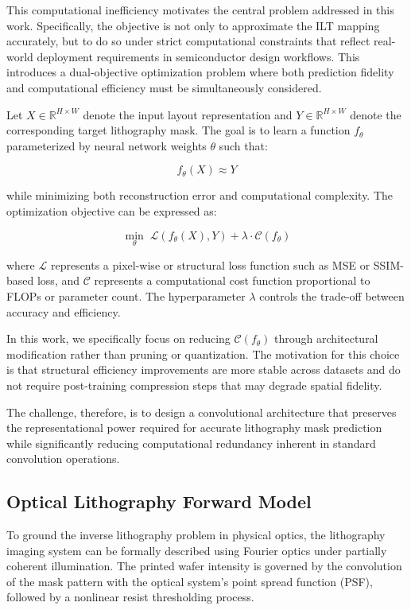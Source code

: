 \documentclass[conference]{IEEEtran}
\begin{document}
This computational inefficiency motivates the central problem addressed in this work. Specifically, the objective is not only to approximate the ILT mapping accurately, but to do so under strict computational constraints that reflect real-world deployment requirements in semiconductor design workflows. This introduces a dual-objective optimization problem where both prediction fidelity and computational efficiency must be simultaneously considered.

Let \( X \in \mathbb{R}^{H \times W} \) denote the input layout representation and \( Y \in \mathbb{R}^{H \times W} \) denote the corresponding target lithography mask. The goal is to learn a function \( f_{\theta} \) parameterized by neural network weights \( \theta \) such that:

\[
f_{\theta}(X) \approx Y
\]

while minimizing both reconstruction error and computational complexity. The optimization objective can be expressed as:

\[
\min_{\theta} \; \mathcal{L}(f_{\theta}(X), Y) + \lambda \cdot \mathcal{C}(f_{\theta})
\]

where \( \mathcal{L} \) represents a pixel-wise or structural loss function such as MSE or SSIM-based loss, and \( \mathcal{C} \) represents a computational cost function proportional to FLOPs or parameter count. The hyperparameter \( \lambda \) controls the trade-off between accuracy and efficiency.

In this work, we specifically focus on reducing \( \mathcal{C}(f_{\theta}) \) through architectural modification rather than pruning or quantization. The motivation for this choice is that structural efficiency improvements are more stable across datasets and do not require post-training compression steps that may degrade spatial fidelity.

The challenge, therefore, is to design a convolutional architecture that preserves the representational power required for accurate lithography mask prediction while significantly reducing computational redundancy inherent in standard convolution operations.





\subsection{\textbf{Optical Lithography Forward Model}}

To ground the inverse lithography problem in physical optics, the lithography imaging system can be formally described using Fourier optics under partially coherent illumination. The printed wafer intensity is governed by the convolution of the mask pattern with the optical system's point spread function (PSF), followed by a nonlinear resist thresholding process.
\end{document}
